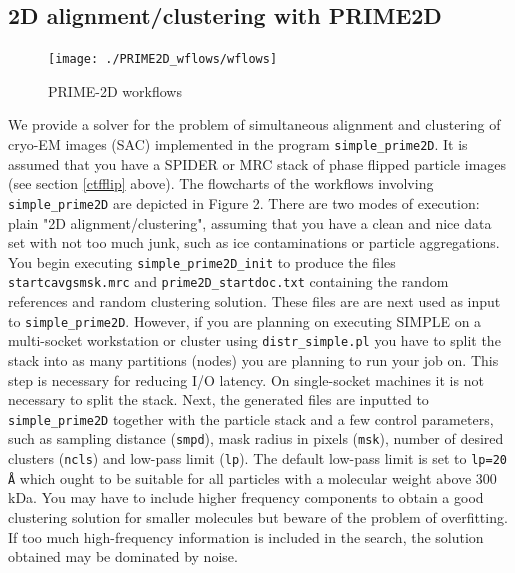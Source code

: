 \documentclass[a4paper,11pt]{article}
\newcommand{\prgname}[1]{\textcolor{NavyBlue}{\texttt{#1}}}
\begin{document}
\subsection{2D alignment/clustering with PRIME2D}
\label{prime2D}
\begin{figure}
\texttt{[image: ./PRIME2D\_wflows/wflows]}
\caption{PRIME-2D workflows}
\end{figure}
We provide a solver for the problem of simultaneous alignment and clustering of cryo-EM images (SAC) implemented in the program \prgname{simple\_prime2D}. It is assumed that you have a SPIDER or MRC stack of phase flipped particle images (see section \ref{ctfflip} above). The flowcharts of the workflows involving \prgname{simple\_prime2D} are depicted in Figure 2. There are two modes of execution: plain "2D alignment/clustering", assuming that you have a clean and nice data set with not too much junk, such as ice contaminations or particle aggregations. You begin executing \prgname{simple\_prime2D\_init} to produce the files \texttt{startcavgsmsk.mrc} and \texttt{prime2D\_startdoc.txt} containing the random references and random clustering solution. These files are are next used as input to \prgname{simple\_prime2D}. However, if you are planning on executing SIMPLE on a multi-socket workstation or cluster using \prgname{distr\_simple.pl} you have to split the stack into as many partitions (nodes) you are planning to run your job on. This step is necessary for reducing I/O latency. On single-socket machines it is not necessary to split the stack. Next, the generated files are inputted to \prgname{simple\_prime2D} together with the particle stack and a few control parameters, such as sampling distance (\texttt{smpd}), mask radius in pixels (\texttt{msk}), number of desired clusters (\texttt{ncls}) and low-pass limit (\texttt{lp}). The default low-pass limit is set to \texttt{lp=20 \AA{}} which ought to be suitable for all particles with a molecular weight above 300 kDa. You may have to include higher frequency components to obtain a good clustering solution for smaller molecules but beware of the problem of overfitting. If too much high-frequency information is included in the search, the solution obtained may be dominated by noise.
\end{document}
